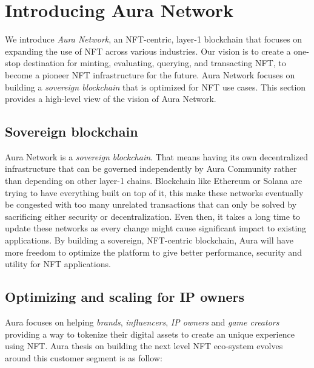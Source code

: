\documentclass[11pt, titlepage]{article}
\begin{document}
\section{Introducing Aura Network}

We introduce \emph{Aura Network}, an NFT-centric, layer-1 blockchain that focuses on expanding the use of NFT across various industries. Our vision is to create a one-stop destination for minting, evaluating, querying, and transacting NFT, to become a pioneer NFT infrastructure for the future. Aura Network focuses on building a \emph{sovereign blockchain} that is optimized for NFT use cases. This section provides a high-level view of the vision of Aura Network.

\subsection{Sovereign blockchain}
Aura Network is a \emph{sovereign blockchain}. That means having its own decentralized infrastructure that can be governed independently by Aura Community rather than depending on other layer-1 chains. Blockchain like Ethereum or Solana are trying to have everything built on top of it, this make these networks eventually be congested with too many unrelated transactions that can only be solved by sacrificing either security or decentralization. Even then, it takes a long time to update these networks as every change might cause significant impact to existing applications. By building a sovereign, NFT-centric blockchain, Aura will have more freedom to optimize the platform to give better performance, security and utility for NFT applications. 

\subsection{Optimizing and scaling for IP owners}
Aura focuses on helping \emph{brands}, \emph{influencers}, \emph{IP owners} and \emph{game creators} providing a way to tokenize their digital assets to create an unique experience using NFT. Aura thesis on building the next level NFT eco-system evolves around this customer segment is as follow:
\end{document}
